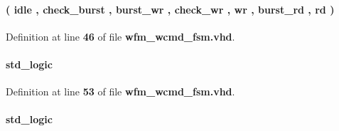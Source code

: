 \paragraph[{state\+\_\+type}]{ {\bfseries \textcolor{vhdlchar}{(}\textcolor{vhdlchar}{ }\textcolor{vhdlchar}{idle}\textcolor{vhdlchar}{ }\textcolor{vhdlchar}{,}\textcolor{vhdlchar}{ }\textcolor{vhdlchar}{check\+\_\+burst}\textcolor{vhdlchar}{ }\textcolor{vhdlchar}{,}\textcolor{vhdlchar}{ }\textcolor{vhdlchar}{burst\+\_\+wr}\textcolor{vhdlchar}{ }\textcolor{vhdlchar}{,}\textcolor{vhdlchar}{ }\textcolor{vhdlchar}{check\+\_\+wr}\textcolor{vhdlchar}{ }\textcolor{vhdlchar}{,}\textcolor{vhdlchar}{ }\textcolor{vhdlchar}{wr}\textcolor{vhdlchar}{ }\textcolor{vhdlchar}{,}\textcolor{vhdlchar}{ }\textcolor{vhdlchar}{burst\+\_\+rd}\textcolor{vhdlchar}{ }\textcolor{vhdlchar}{,}\textcolor{vhdlchar}{ }\textcolor{vhdlchar}{rd}\textcolor{vhdlchar}{ }\textcolor{vhdlchar}{)}\textcolor{vhdlchar}{ }} \hspace{0.3cm}{\ttfamily [Type]}}\label{classwfm__wcmd__fsm_1_1arch_a157e4b9cb84b3793910e599aee47e6bf}


Definition at line {\bf 46} of file {\bf wfm\+\_\+wcmd\+\_\+fsm.\+vhd}.

\paragraph[{wfm\+\_\+load\+\_\+reg0}]{ {\bfseries \textcolor{comment}{std\+\_\+logic}\textcolor{vhdlchar}{ }} \hspace{0.3cm}{\ttfamily [Signal]}}\label{classwfm__wcmd__fsm_1_1arch_a3fa809dbb105475bdb816f2bc1962834}


Definition at line {\bf 53} of file {\bf wfm\+\_\+wcmd\+\_\+fsm.\+vhd}.

\paragraph[{wfm\+\_\+load\+\_\+reg1}]{ {\bfseries \textcolor{comment}{std\+\_\+logic}\textcolor{vhdlchar}{ }} \hspace{0.3cm}{\ttfamily [Signal]}}\label{classwfm__wcmd__fsm_1_1arch_a97c6ae49e602381806d52a0bcd843df3}


